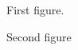 \begin{figure}
\caption{First figure.}
\end{figure}
\begin{figure}
\caption{Second figure}
\end{figure}
